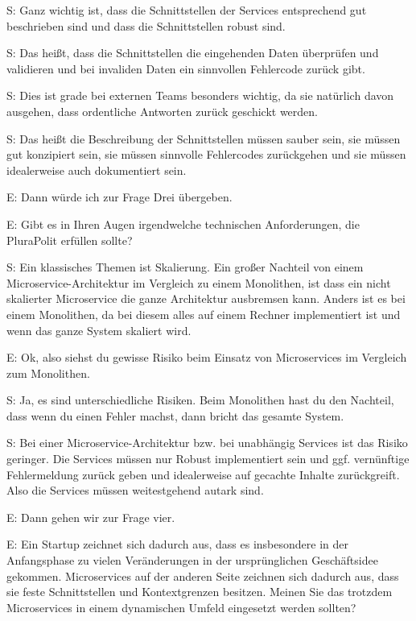  \label{appendix:s-13}
S: Ganz wichtig ist, dass die Schnittstellen der Services entsprechend gut beschrieben sind und dass die Schnittstellen robust sind.

 \label{appendix:s-14}  \label{appendix:s-15}
S: Das heißt, dass die Schnittstellen die eingehenden Daten überprüfen und validieren und bei invaliden Daten ein sinnvollen Fehlercode zurück gibt.

S: Dies ist grade bei externen Teams besonders wichtig, da sie natürlich davon ausgehen, dass  ordentliche Antworten zurück geschickt werden.

S: Das heißt die Beschreibung der Schnittstellen müssen sauber sein, sie müssen gut konzipiert sein, sie müssen sinnvolle Fehlercodes zurückgehen und sie müssen idealerweise auch dokumentiert sein.

E: Dann würde ich zur Frage Drei übergeben. 

E: Gibt es in Ihren Augen irgendwelche technischen Anforderungen, die PluraPolit erfüllen sollte? 

 \label{appendix:s-16}
S: Ein klassisches Themen ist Skalierung. Ein großer Nachteil von einem Microservice-Architektur im Vergleich zu einem Monolithen, ist dass ein nicht skalierter Microservice die ganze Architektur ausbremsen kann. Anders ist es bei einem Monolithen, da bei diesem alles auf einem Rechner implementiert ist und wenn das ganze System skaliert wird.

E: Ok, also siehst du gewisse Risiko beim Einsatz von Microservices im Vergleich zum Monolithen. 

 \label{appendix:s-17}
S: Ja, es sind unterschiedliche Risiken. Beim Monolithen hast du den Nachteil, dass wenn du einen Fehler machst, dann bricht das gesamte System.

 \label{appendix:s-18}
S: Bei einer Microservice-Architektur bzw. bei unabhängig Services ist das Risiko geringer. Die Services müssen nur Robust implementiert sein und ggf. vernünftige Fehlermeldung zurück geben und idealerweise auf gecachte Inhalte zurückgreift. Also die Services müssen weitestgehend autark sind.

E: Dann gehen wir zur Frage vier.

E: Ein Startup zeichnet sich dadurch aus, dass es insbesondere in der Anfangsphase zu vielen Veränderungen in der ursprünglichen Geschäftsidee gekommen. Microservices auf der anderen Seite zeichnen sich dadurch aus, dass sie feste Schnittstellen und Kontextgrenzen besitzen. Meinen Sie das trotzdem Microservices in einem dynamischen Umfeld eingesetzt werden sollten?

